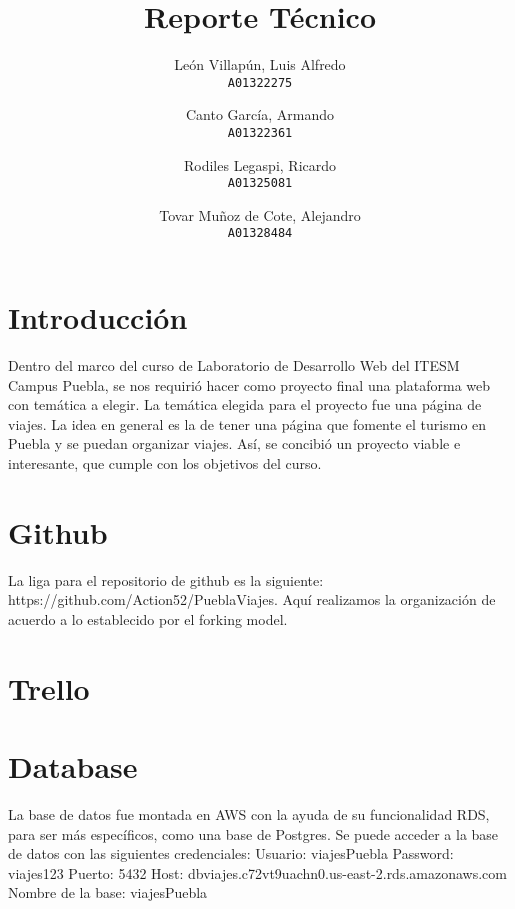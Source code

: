 \documentclass{article}
\title{Reporte Técnico}
\author{
  León Villapún, Luis Alfredo\\
  \texttt{A01322275}
  \and
  Canto García, Armando\\
  \texttt{A01322361}
  \and
  Rodiles Legaspi, Ricardo\\
  \texttt{A01325081}
  \and
  Tovar Muñoz de Cote, Alejandro\\
  \texttt{A01328484}
}
\begin{document}
	\maketitle
	\newpage
	
	\tableofcontents
	\newpage
	
	\section{Introducción}
	Dentro del marco del curso de Laboratorio de Desarrollo Web del ITESM Campus Puebla, se nos requirió hacer como proyecto final una plataforma web con temática a elegir.
	\linebreak
	La temática elegida para el proyecto fue una página de viajes. La idea en general es la de tener una página que fomente el turismo en Puebla y se puedan organizar viajes.
	\linebreak
	Así, se concibió un proyecto viable e interesante, que cumple con los objetivos del curso.
			
			
	\section{Github}
	La liga para el repositorio de github es la siguiente: https://github.com/Action52/PueblaViajes.
	\linebreak
	Aquí realizamos la organización de acuerdo a lo establecido por el forking model.
	
	
	\section{Trello}

	
	
	\section{Database}
	La base de datos fue montada en AWS con la ayuda de su funcionalidad RDS, para ser más específicos, como una base de Postgres.
	Se puede acceder a la base de datos con las siguientes credenciales:
	\linebreak
	Usuario: viajesPuebla
	\linebreak
	Password: viajes123
	\linebreak
	Puerto: 5432
	\linebreak
	Host: dbviajes.c72vt9uachn0.us-east-2.rds.amazonaws.com
	\linebreak
	Nombre de la base: viajesPuebla
	
\end{document}
